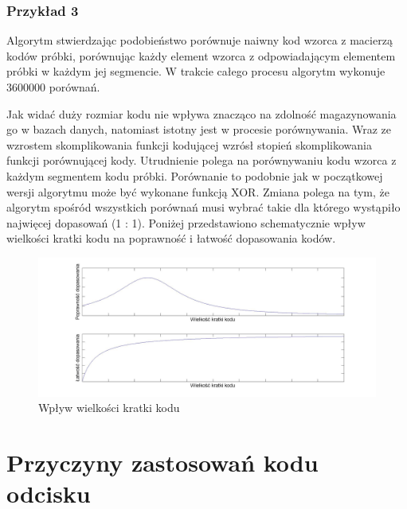 \subsubsection{Przykład 3\footnotemark[\value{footnote}]}
Algorytm stwierdzając podobieństwo porównuje naiwny kod wzorca z macierzą kodów próbki, porównując każdy element wzorca z odpowiadającym elementem próbki w każdym jej segmencie. W trakcie całego procesu 
algorytm wykonuje 3600000 porównań.
\vspace{.5cm}\par
Jak widać duży rozmiar kodu nie wpływa znacząco na zdolność magazynowania go w bazach danych, natomiast istotny jest w procesie porównywania. Wraz ze wzrostem skomplikowania funkcji kodującej wzrósł 
stopień skomplikowania funkcji porównującej kody. Utrudnienie polega na porównywaniu kodu wzorca z każdym segmentem kodu próbki. Porównanie to podobnie jak w początkowej wersji algorytmu może być wykonane 
funkcją XOR. Zmiana polega na tym, że algorytm spośród wszystkich porównań musi wybrać takie dla którego wystąpiło najwięcej dopasowań (1 : 1). Poniżej przedstawiono schematycznie wpływ wielkości kratki kodu na poprawność i łatwość dopasowania kodów.
\begin{figure}[h]
    \begin{center}
	\includegraphics[angle=0,scale=.25]{img/crate_size.jpg}
	\caption{Wpływ wielkości kratki kodu}
	\label{img:crate_size}
    \end{center}
\end{figure}

\section[Przyczyny zastosowań kodu odcisku][Przyczyny zastosowań kodu odcisku]{Przyczyny zastosowań kodu odcisku}

